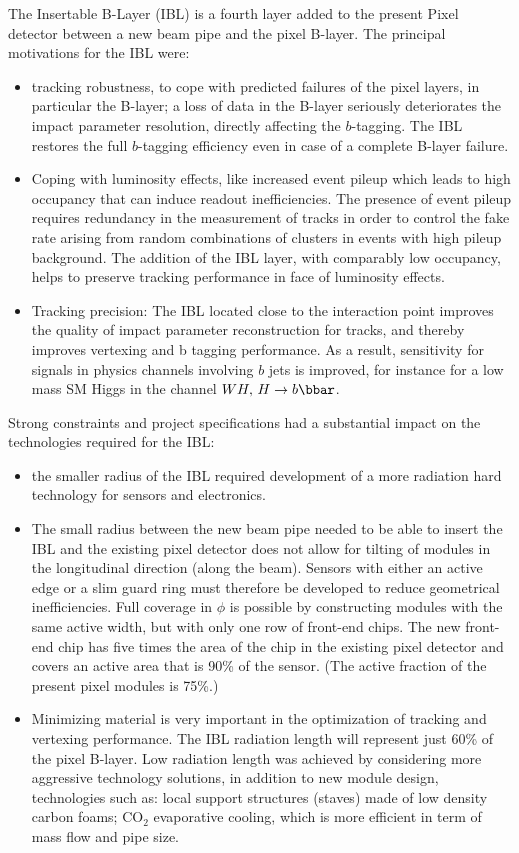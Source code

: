 The Insertable B-Layer (IBL) is a fourth layer added to the present Pixel detector between a
new beam pipe and the pixel B-layer. The principal motivations for the IBL were:

\begin{itemize}
\item tracking robustness, to cope with predicted failures of the pixel layers, in particular the B-layer; 
  a loss of data in the B-layer
seriously deteriorates the impact parameter resolution, directly affecting the $b$-tagging. The
IBL restores the full $b$-tagging efficiency even in case of a complete B-layer failure.
  \item Coping with luminosity effects, like increased event pileup which leads to  high occupancy that can induce readout inefficiencies. The presence of event pileup requires redundancy in
the measurement of tracks in order to control the fake rate arising from random combinations
of clusters in events with high pileup background. The addition of the IBL layer, with
comparably low occupancy, helps to preserve tracking performance in face of luminosity
effects.
  \item Tracking precision: The IBL located close to the interaction point improves the quality of
impact parameter reconstruction for tracks, and thereby improves vertexing and b tagging
performance. As a result, sensitivity for signals in physics channels involving $b$ jets is improved,
for instance for a low mass SM Higgs in the channel $WH,\,H\to b\bbar$.
\end{itemize}

Strong constraints and project specifications had a substantial impact on the technologies
required for the IBL:

\begin{itemize}
\item the smaller radius of the IBL required development of a more radiation hard technology for
sensors and electronics.
\item The small radius between the new beam pipe needed to be able to insert the IBL
 and the existing pixel detector does not allow
for tilting of modules in the longitudinal direction (along the beam). Sensors with either
an active edge or a slim guard ring must therefore be developed to reduce geometrical inefficiencies.
Full coverage in $\phi$ is possible by constructing modules with the same active
width, but with only one row of front-end chips. The new front-end chip has five times the
area of the chip in the existing pixel detector and covers an active area that is 90\% of the
sensor. (The active fraction of the present pixel modules is 75\%.)
 \item Minimizing material is very important in the optimization of tracking and vertexing performance.
The IBL radiation length will represent just 60\% of the pixel B-layer. Low
radiation length was achieved by considering more aggressive technology solutions, in addition
to new module design, technologies such as: local support structures (staves) made of low
density carbon foams; CO$_2$ evaporative cooling, which is more efficient in term of mass flow
and pipe size.
\end{itemize}


